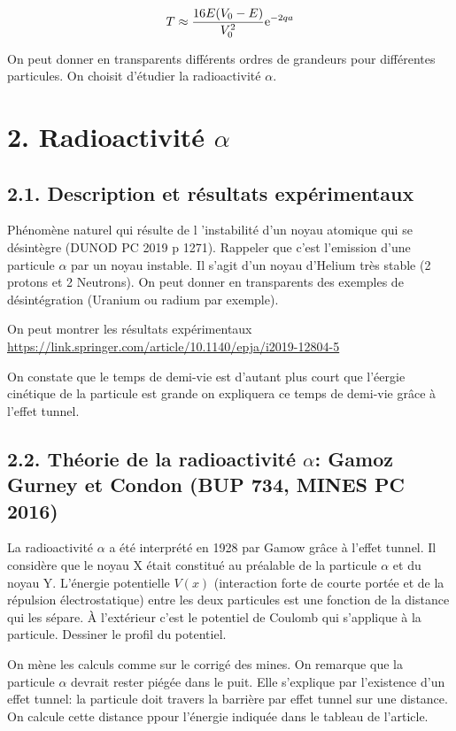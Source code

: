 \documentclass[french, a4paper, 10pt, twocolumn, landscape]{article}
\begin{document}
\begin{equation}
    T\approx \dfrac{16E(V_0-E)}{V_0^2}{\rm e}^{-2qa}
\end{equation}

On peut donner en transparents différents ordres de grandeurs pour différentes particules. On choisit d'étudier la radioactivité $\alpha$.

\section*{2. Radioactivité $\alpha$}



\subsection*{2.1. Description et résultats expérimentaux}
Phénomène naturel qui résulte de l 'instabilité d'un noyau atomique qui se désintègre (DUNOD PC 2019 p 1271). Rappeler que c'est l'emission d'une particule $\alpha$ par un noyau instable. Il s'agit d'un noyau d'Helium très stable (2 protons et 2 Neutrons). On peut donner en transparents des exemples de désintégration (Uranium ou radium par exemple).

On peut montrer les résultats expérimentaux \url{https://link.springer.com/article/10.1140/epja/i2019-12804-5}

On constate que le temps de demi-vie est d'autant plus court que l'éergie cinétique de la particule est grande on expliquera ce temps de demi-vie grâce à l'effet tunnel.

\subsection*{2.2. Théorie de la radioactivité $\alpha$: Gamoz Gurney et Condon (BUP 734, MINES PC 2016)}


La radioactivité $\alpha $ a été interprété en 1928 par Gamow grâce à l'effet tunnel. Il considère que le noyau X était constitué au préalable de la particule $\alpha$ et du noyau Y. L'énergie potentielle $V(x)$ (interaction forte de courte portée et de la répulsion électrostatique) entre les deux particules est une fonction de la distance qui les sépare. À l'extérieur c'est le potentiel de Coulomb qui s'applique à la particule. Dessiner le profil du potentiel.\medskip

On mène les calculs comme sur le corrigé des mines. On remarque que la particule $\alpha$ devrait rester piégée dans le puit. Elle s'explique par l'existence d'un effet tunnel: la particule doit travers la barrière par effet tunnel sur une distance. On calcule cette distance ppour l'énergie indiquée dans le tableau de l'article.
\end{document}
